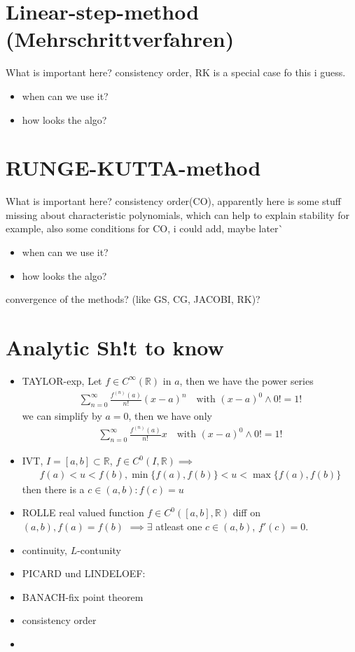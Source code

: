 \documentclass[]{scrartcl}
\newcommand{\R}{\mathbb{R}}
\newcommand{\<}{\trianglelefteq}
\begin{document}
\section*{Linear-step-method (Mehrschrittverfahren)}
What is important here? consistency order, RK is a special case fo this i guess.
\begin{itemize}
	\item when can we use it?\\
	\item how looks the algo?\\
\end{itemize}

\section*{RUNGE-KUTTA-method}
What is important here? consistency order(CO), apparently here is some stuff missing about characteristic polynomials, which can help to explain stability for example, also some conditions for CO, i could add, maybe later^^ 
\begin{itemize}
	\item when can we use it?\\
	\item how looks the algo?\\
\end{itemize}

convergence of the methods? (like GS, CG, JACOBI, RK)?

\section*{Analytic Sh!t to know}
\begin{itemize}
	\item TAYLOR-exp, Let $f \in C^{\infty}(\R)$ in $a$, then we have the power series
	\begin{align*}
		\sum_{n=0}^{\infty} \frac{f^{(n)}(a)}{n!} (x-a)^n \quad \text{with } (x-a)^0 \wedge 0! = 1!
	\end{align*}
	we can simplify by $a=0$, then we have only
	\begin{align*}
		\sum_{n=0}^{\infty} \frac{f^{(n)}(a)}{n!}x \quad \text{with } (x-a)^0 \wedge 0! = 1!
	\end{align*}
	\item IVT, $I = [a,b] \subset \R$, $f \in C^0(I,\R) \implies$
	\begin{align*}
		f(a) < u < f(b), \min\{f(a), f(b)\} < u <\max\{f(a),f(b)\}
	\end{align*}
	then there is a $c \in (a,b) \colon f(c) = u$
	\item ROLLE real valued function $f \in C^0([a,b],\R)$ diff on $(a,b), f(a) = f(b)$ $\implies \exists$ atleast one $c \in (a,b)$, $f'(c) = 0$.
	\item continuity, $L$-contunity
	\item PICARD und LINDELOEF: 
	
	\item BANACH-fix point theorem
	\item consistency order
	\item 
\end{itemize}
\end{document}
